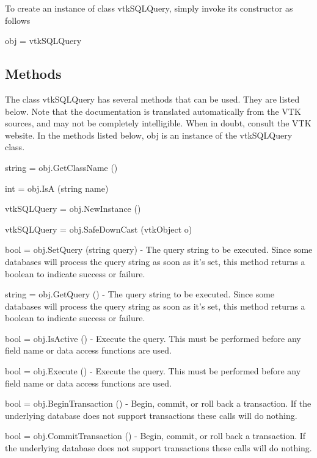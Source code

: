 To create an instance of class vtk\-S\-Q\-L\-Query, simply invoke its constructor as follows \begin{DoxyVerb}  obj = vtkSQLQuery
\end{DoxyVerb}
 \hypertarget{vtkwidgets_vtkxyplotwidget_Methods}{}\subsection{Methods}\label{vtkwidgets_vtkxyplotwidget_Methods}
The class vtk\-S\-Q\-L\-Query has several methods that can be used. They are listed below. Note that the documentation is translated automatically from the V\-T\-K sources, and may not be completely intelligible. When in doubt, consult the V\-T\-K website. In the methods listed below, {\ttfamily obj} is an instance of the vtk\-S\-Q\-L\-Query class. 
\begin{DoxyItemize}
\item {\ttfamily string = obj.\-Get\-Class\-Name ()}  
\item {\ttfamily int = obj.\-Is\-A (string name)}  
\item {\ttfamily vtk\-S\-Q\-L\-Query = obj.\-New\-Instance ()}  
\item {\ttfamily vtk\-S\-Q\-L\-Query = obj.\-Safe\-Down\-Cast (vtk\-Object o)}  
\item {\ttfamily bool = obj.\-Set\-Query (string query)} -\/ The query string to be executed. Since some databases will process the query string as soon as it's set, this method returns a boolean to indicate success or failure.  
\item {\ttfamily string = obj.\-Get\-Query ()} -\/ The query string to be executed. Since some databases will process the query string as soon as it's set, this method returns a boolean to indicate success or failure.  
\item {\ttfamily bool = obj.\-Is\-Active ()} -\/ Execute the query. This must be performed before any field name or data access functions are used.  
\item {\ttfamily bool = obj.\-Execute ()} -\/ Execute the query. This must be performed before any field name or data access functions are used.  
\item {\ttfamily bool = obj.\-Begin\-Transaction ()} -\/ Begin, commit, or roll back a transaction. If the underlying database does not support transactions these calls will do nothing.  
\item {\ttfamily bool = obj.\-Commit\-Transaction ()} -\/ Begin, commit, or roll back a transaction. If the underlying database does not support transactions these calls will do nothing.  

\end{DoxyItemize}
